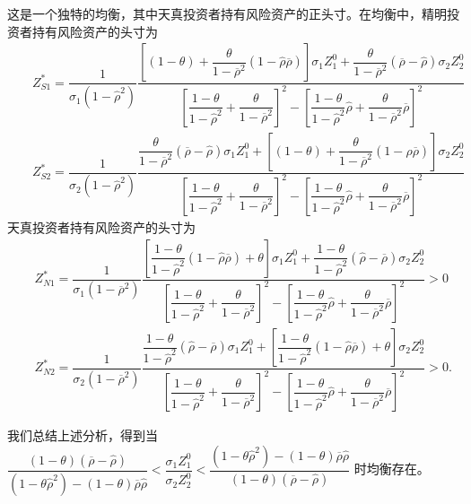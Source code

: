\documentclass[10.0pt]{article}
\begin{document}
这是一个独特的均衡，其中天真投资者持有风险资产的正头寸。在均衡中，精明投资者持有风险资产的头寸为
\begin{eqnarray}
& & Z_{S 1}^* = \dfrac1{\sigma_1 (1 - {\hat \rho}^2)} \dfrac{\left[ (1 - \theta) + \dfrac{\theta}{1 - \overline{\rho}^2} (1 - {\hat \rho} \overline{\rho}) \right] \sigma_1 Z_1^0 + \dfrac{\theta}{1 - \overline{\rho}^2} (\overline{\rho} - {\hat \rho}) \sigma_2 Z_2^0}{\left[ \dfrac{1 - \theta}{1 - {\hat \rho}^2} + \dfrac{\theta}{1 - \overline{\rho}^2} \right]^2 - \left[ \dfrac{1 - \theta}{1 - {\hat \rho}^2} {\hat \rho} + \dfrac{\theta}{1 - \overline{\rho}^2} \overline{\rho} \right]^2} \\
& & Z_{S 2}^* = \dfrac1{\sigma_2 (1 - {\hat \rho}^2)} \dfrac{\dfrac{\theta}{1 - \overline{\rho}^2} (\overline{\rho} - {\hat \rho}) \sigma_1 Z_1^0 + \left[ (1 - \theta) + \dfrac{\theta}{1 - \overline{\rho}^2} (1 - {\hat \rho} \overline{\rho}) \right] \sigma_2 Z_2^0}{\left[ \dfrac{1 - \theta}{1 - {\hat \rho}^2} + \dfrac{\theta}{1 - \overline{\rho}^2} \right]^2 - \left[ \dfrac{1 - \theta}{1 - {\hat \rho}^2} {\hat \rho} + \dfrac{\theta}{1 - \overline{\rho}^2} \overline{\rho} \right]^2}
\end{eqnarray}
天真投资者持有风险资产的头寸为
\begin{eqnarray}
& & Z_{N 1}^* = \dfrac1{\sigma_1 (1 - \overline{\rho}^2)} \dfrac{\left[ \dfrac{1 - \theta}{1 - {\hat \rho}^2} (1 - {\hat \rho} \overline{\rho}) + \theta \right] \sigma_1 Z_1^0 + \dfrac{1 - \theta}{1 - {\hat \rho}^2} ({\hat \rho} - \overline{\rho}) \sigma_2 Z_2^0}{\left[ \dfrac{1 - \theta}{1 - {\hat \rho}^2} + \dfrac{\theta}{1 - \overline{\rho}^2} \right]^2 - \left[ \dfrac{1 - \theta}{1 - {\hat \rho}^2} {\hat \rho} + \dfrac{\theta}{1 - \overline{\rho}^2} \overline{\rho} \right]^2} > 0 \\
& & Z_{N 2}^* = \dfrac1{\sigma_2 (1 - \overline{\rho}^2)} \dfrac{\dfrac{1 - \theta}{1 - {\hat \rho}^2} ({\hat \rho} - \overline{\rho}) \sigma_1 Z_1^0 + \left[ \dfrac{1 - \theta}{1 - {\hat \rho}^2} (1 - {\hat \rho} \overline{\rho}) + \theta \right] \sigma_2 Z_2^0}{\left[ \dfrac{1 - \theta}{1 - {\hat \rho}^2} + \dfrac{\theta}{1 - \overline{\rho}^2} \right]^2 - \left[ \dfrac{1 - \theta}{1 - {\hat \rho}^2} {\hat \rho} + \dfrac{\theta}{1 - \overline{\rho}^2} \overline{\rho} \right]^2} > 0.
\end{eqnarray}

我们总结上述分析，得到当 $ \dfrac{(1 - \theta) (\overline{\rho} - {\hat \rho})}{(1 - \theta {\hat \rho}^2) - (1 - \theta) \overline{\rho} {\hat \rho}} < \dfrac{\sigma_1 Z_1^0}{\sigma_2 Z_2^0} < \dfrac{(1 - \theta {\hat \rho}^2) - (1 - \theta) \overline{\rho} {\hat \rho}}{(1 - \theta) (\overline{\rho} - {\hat \rho})} $ 时均衡存在。
\end{document}
